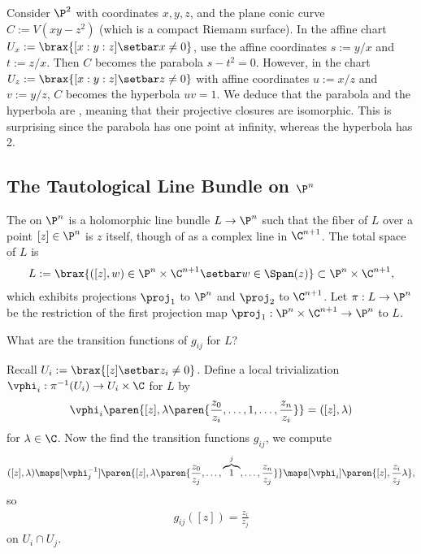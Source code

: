\documentclass[11pt]{report}
\begin{document}
\begin{ex}
Consider $\P^2$ with coordinates $x,y,z$, and the plane conic curve $C:=V(xy-z^2)$ (which is a compact Riemann surface). In the affine chart $U_x:=\brax{[x:y:z]\setbar x \ne 0}$, use the affine coordinates $s:=y/x$ and $t:=z/x$. Then $C$ becomes the parabola $s-t^2=0$. However, in the chart $U_z:= \brax{[x:y:z]\setbar z \ne 0}$ with affine coordinates $u:=x/z$ and $v:=y/z$, $C$ becomes the hyperbola $uv=1$. We deduce that the parabola and the hyperbola are , meaning that their projective closures are isomorphic. This is surprising since the parabola has one point at infinity, whereas the hyperbola has 2.
\end{ex}


\subsection{\texorpdfstring{The Tautological Line Bundle on $\P^n$}{The Tautological Line Bundle on Pn}}

\begin{defn}
The  on $\P^n$ is a holomorphic line bundle $L \to \P^n$ such that the fiber of $L$ over a point $[z] \in \P^n$ is $z$ itself, though of as a complex line in $\C^{n+1}$. The total space of $L$ is
\begin{align*}
L:= \brax{([z],w)\in \P^n \times \C^{n+1}\setbar w \in \Span(z)} \subset \P^n \times \C^{n+1},
\end{align*}
which exhibits projections $\proj_1$ to $\P^n$ and $\proj_2$ to $\C^{n+1}$. Let $\pi:L \to\P^n$ be the restriction of the first projection map $\proj_1:\P^n\times \C^{n+1} \to \P^n$ to $L$.
\end{defn}

\begin{que}
What are the transition functions of $g_{ij}$ for $L$?
\end{que}

Recall $U_i := \brax{[z] \setbar z_i \ne 0}$. Define a local trivialization $\vphi_i:\pi^{-1}(U_i) \to U_i \times \C$ for $L$ by
\begin{align*}
\vphi_i \paren{[z], \lambda \paren{\frac{z_0}{z_i},\dots,1,\dots,\frac{z_n}{z_i}} } = ([z],\lambda)
\end{align*}
for $\lambda \in \C$. Now the find the transition functions $g_{ij}$, we compute
\begin{align*}
([z],\lambda)\maps[\vphi_j^{-1}] \paren{[z],\lambda \paren{\frac{z_0}{z_j},\dots,\overbrace{1}^j,\dots,\frac{z_n}{z_j}}} \maps[\vphi_i]\paren{[z],\frac{z_i}{z_j}\lambda},
\end{align*}
so
\begin{align*}
g_{ij}([z])=\frac{z_i}{z_j}
\end{align*}
on $U_i \cap U_j$.
\end{document}
